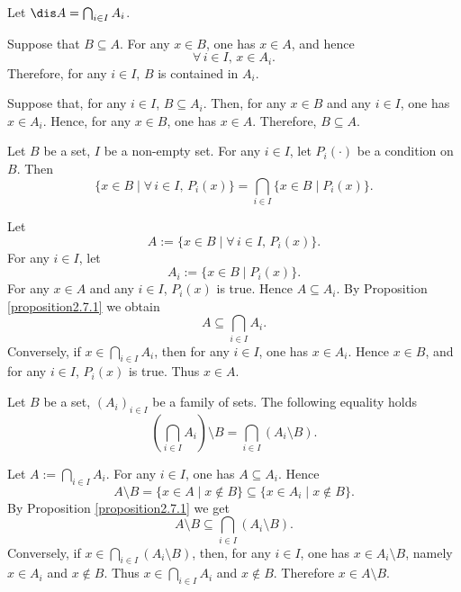 \begin{proofenv}
Let \( \dis A = \bigcap_{i \in I} A_i \).

Suppose that \( B \subseteq A \). For any \( x \in B \),  one has \( x \in A \),  and hence
\[
\forall\,  i \in I, \,  x \in A_i.
\]
Therefore,  for any \( i \in I \),  \( B \) is contained in \( A_i \).

Suppose that,  for any \( i \in I \),  \( B \subseteq A_i \). Then,  for any \( x \in B \) and any \( i \in I \),  one has \( x \in A_i \). Hence,  for any \( x \in B \),  one has \( x \in A \). Therefore, 
\( B \subseteq A \).
\end{proofenv}

\begin{corollaryenv}\label{2.7.4}
Let \( B \) be a set,  \( I \) be a non-empty set. For any \( i \in I \),  let \( P_i(\cdot) \) be a condition on \( B \). Then
\[
\{x \in B \mid \forall\,  i \in I, \,  P_i(x)\} = \bigcap_{i \in I} \{x \in B \mid P_i(x)\}.
\]
\end{corollaryenv}

\begin{proofenv}
Let
\[
A := \{x \in B \mid \forall\,  i \in I, \,  P_i(x)\}.
\]
For any \( i \in I \),  let
\[
A_i := \{x \in B \mid P_i(x)\}.
\]
For any \( x \in A \) and any \( i \in I \),  \( P_i(x) \) is true. Hence \( A \subseteq A_i \). By Proposition \ref{proposition2.7.1} we obtain
\[
A \subseteq \bigcap_{i \in I} A_i.
\]
Conversely,  if \( x \in \bigcap_{i \in I} A_i \),  then for any \( i \in I \),  one has \( x \in A_i \). Hence \( x \in B \),  and for any \( i \in I \),  \( P_i(x) \) is true. Thus \( x \in A \).
\end{proofenv}

\begin{propositionenv}
Let \( B \) be a set,  \( (A_i)_{i \in I} \) be a family of sets. The following equality holds
\[
\left( \bigcap_{i \in I} A_i \right) \setminus B = \bigcap_{i \in I} (A_i \setminus B).
\]
\end{propositionenv}

\begin{proofenv}
Let \( A := \bigcap_{i \in I} A_i \). For any \( i \in I \),  one has \( A \subseteq A_i \). Hence
\[
A \setminus B = \{x \in A \mid x \notin B\} \subseteq \{x \in A_i \mid x \notin B\}.
\]
By Proposition \ref{proposition2.7.1} we get
\[
A \setminus B \subseteq \bigcap_{i \in I} (A_i \setminus B).
\]
Conversely,  if \( x \in \bigcap_{i \in I} (A_i \setminus B) \),  then,  for any \( i \in I \),  one has \( x \in A_i \setminus B \),  namely \( x \in A_i \) and \( x \notin B \). Thus \( x \in \bigcap_{i \in I} A_i \) and \( x \notin B \). Therefore \( x \in A \setminus B \).
\end{proofenv}

